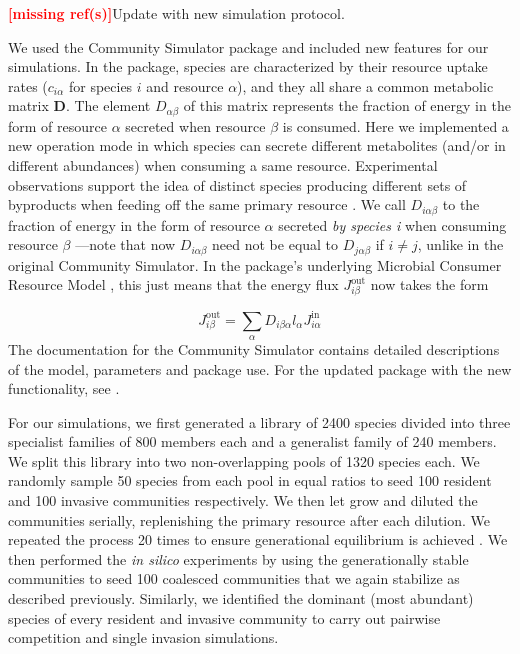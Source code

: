 \documentclass[a4paper,10pt]{article}
\newcommand{\mr}{\textcolor{red}{\textbf{[missing ref(s)]}}}
\begin{document}
\mr Update with new simulation protocol.

We used the Community Simulator package \cite{Marsland2020} and included new
features for our simulations. In the package,
species are characterized by their resource uptake rates ($c_{i\alpha}$ for
species $i$ and resource $\alpha$), and they all
share a common metabolic matrix $\mathbf{D}$.
The element $D_{\alpha\beta}$
of this matrix represents the fraction of energy in the form of resource $\alpha$
secreted when resource $\beta$ is consumed.
Here we implemented a new operation mode
in which species can secrete different metabolites (and/or
in different abundances) when consuming a same resource. Experimental observations
support the idea of distinct species producing different sets of byproducts when
feeding off the same primary resource
\cite{Harcombe2014,Pinu2018}.
We call $D_{i\alpha\beta}$ to the
fraction of energy in the form of resource $\alpha$ secreted \textit{by species
i} when consuming resource $\beta$ ---note that now $D_{i\alpha\beta}$ need not be
equal to $D_{j\alpha\beta}$ if $i \neq j$, unlike in the original Community
Simulator. In the package's underlying Microbial Consumer Resource Model
\cite{Goldford2018,Marsland2019}, this just means that the energy flux
$J^{\mathrm{out}}_{i\beta}$ now takes the form

\begin{equation}
J^{\mathrm{out}}_{i\beta} = \sum_\alpha D_{i\beta\alpha} l_\alpha J^{\mathrm{in}}_{i\alpha}
\label{eq:jout}
\end{equation}
%
The documentation for the Community Simulator contains detailed
descriptions of the model, parameters and package use. For the updated package with
the new functionality, see .

For our simulations,
we first generated a library of 2400 species divided into three specialist
families of 800 members each
and a generalist family of 240 members.
We split this library into two non-overlapping pools of 1320 species each.
We randomly sample 50 species from each pool in equal ratios to seed
100 resident and
100 invasive communities respectively.
We then let grow and diluted the communities serially,
replenishing the primary
resource after each dilution.
We repeated the process 20 times to ensure generational equilibrium is
achieved \cite{Goldford2018}.
We then performed the \textit{in silico} experiments by using the
generationally stable communities to seed 100 coalesced communities
that we again stabilize as described previously.
Similarly, we identified the dominant (most
abundant) species of every resident and invasive community to carry out pairwise
competition and single invasion simulations.
\end{document}
